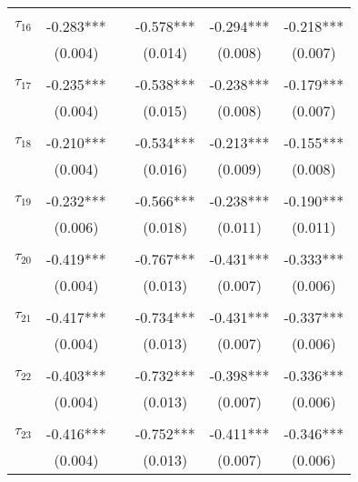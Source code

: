 \begin{tabular}{@{\extracolsep{-0pt}}lccccc}
                &           &&           &           &           \\[-2.1ex]
$\tau_{16}$     & -0.283*** && -0.578*** & -0.294*** & -0.218*** \\
                &  (0.004)  &&  (0.014)  &  (0.008)  &  (0.007)  \\
                &           &&           &           &           \\[-2.1ex]
$\tau_{17}$     & -0.235*** && -0.538*** & -0.238*** & -0.179*** \\
                &  (0.004)  &&  (0.015)  &  (0.008)  &  (0.007)  \\
                &           &&           &           &           \\[-2.1ex]
$\tau_{18}$     & -0.210*** && -0.534*** & -0.213*** & -0.155*** \\
                &  (0.004)  &&  (0.016)  &  (0.009)  &  (0.008)  \\
                &           &&           &           &           \\[-2.1ex]
$\tau_{19}$     & -0.232*** && -0.566*** & -0.238*** & -0.190*** \\
                &  (0.006)  &&  (0.018)  &  (0.011)  &  (0.011)  \\
                &           &&           &           &           \\[-2.1ex]
$\tau_{20}$     & -0.419*** && -0.767*** & -0.431*** & -0.333*** \\
                &  (0.004)  &&  (0.013)  &  (0.007)  &  (0.006)  \\
                &           &&           &           &           \\[-2.1ex]
$\tau_{21}$     & -0.417*** && -0.734*** & -0.431*** & -0.337*** \\
                &  (0.004)  &&  (0.013)  &  (0.007)  &  (0.006)  \\
                &           &&           &           &           \\[-2.1ex]
$\tau_{22}$     & -0.403*** && -0.732*** & -0.398*** & -0.336*** \\
                &  (0.004)  &&  (0.013)  &  (0.007)  &  (0.006)  \\
                &           &&           &           &           \\[-2.1ex]
$\tau_{23}$     & -0.416*** && -0.752*** & -0.411*** & -0.346*** \\
                &  (0.004)  &&  (0.013)  &  (0.007)  &  (0.006)  \\

\end{tabular}
